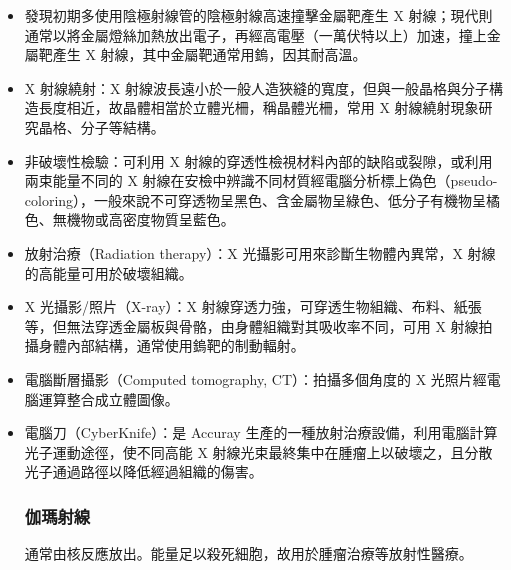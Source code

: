 \documentclass[a4paper,12pt]{report}
\begin{document}
\begin{itemize}
消費者 Wi-Fi 網路有三種常見頻帶：2.4 GHz、5 GHz 和 6 GHz。
\subsubsection{紅外線}
室溫附近物體放出的熱輻射大致處於紅外線，吸收的輻射熱亦以紅外線為主，以旋轉或振動等方式吸收。故紅外線常用於遙控器、熱感攝影、偵測等。
\subsubsection{可見光}
人類眼睛可見的頻帶。
\subsubsection{紫外線}
高溫物體如氣體放電管、太陽等可放出之。可協助皮膚製造維生素 D。長時間曝露可殺死微生物，故常用於消毒、殺菌，但也會造成皮膚曬傷、細胞病變的等。常用於鈔票防偽辨識。
\subsubsection{X 射線}
\bit
\item 發現初期多使用陰極射線管的陰極射線高速撞擊金屬靶產生 X 射線；現代則通常以將金屬燈絲加熱放出電子，再經高電壓（一萬伏特以上）加速，撞上金屬靶產生 X 射線，其中金屬靶通常用鎢，因其耐高溫。
\item X 射線繞射：X 射線波長遠小於一般人造狹縫的寬度，但與一般晶格與分子構造長度相近，故晶體相當於立體光柵，稱晶體光柵，常用 X 射線繞射現象研究晶格、分子等結構。
\item 非破壞性檢驗：可利用 X 射線的穿透性檢視材料內部的缺陷或裂隙，或利用兩束能量不同的 X 射線在安檢中辨識不同材質經電腦分析標上偽色（pseudo-coloring），一般來說不可穿透物呈黑色、含金屬物呈綠色、低分子有機物呈橘色、無機物或高密度物質呈藍色。
\item 放射治療（Radiation therapy）：X 光攝影可用來診斷生物體內異常，X 射線的高能量可用於破壞組織。
\bit
\item X 光攝影/照片（X-ray）：X 射線穿透力強，可穿透生物組織、布料、紙張等，但無法穿透金屬板與骨骼，由身體組織對其吸收率不同，可用 X 射線拍攝身體內部結構，通常使用鎢靶的制動輻射。
\item 電腦斷層攝影（Computed tomography, CT）：拍攝多個角度的 X 光照片經電腦運算整合成立體圖像。
\item 電腦刀（CyberKnife）：是 Accuray 生產的一種放射治療設備，利用電腦計算光子運動途徑，使不同高能 X 射線光束最終集中在腫瘤上以破壞之，且分散光子通過路徑以降低經過組織的傷害。
\eit
\eit
\subsubsection{伽瑪射線}
通常由核反應放出。能量足以殺死細胞，故用於腫瘤治療等放射性醫療。

\end{itemize}
\end{document}
